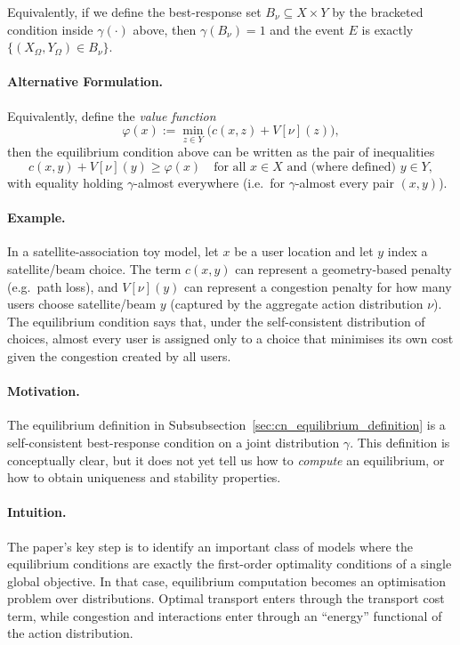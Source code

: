 Equivalently, if we define the best-response set $B_{\nu}\subseteq X\times Y$ by the bracketed condition inside
$\gamma(\cdot)$ above, then $\gamma(B_{\nu})=1$ and the event $E$ is exactly $\{(X_{\Omega},Y_{\Omega})\in B_{\nu}\}$.

\paragraph{Alternative Formulation.}

Equivalently, define the \emph{value function}
$$
\varphi(x):=\min_{z\in Y}\bigl(c(x,z)+V[\nu](z)\bigr),
$$
then the equilibrium condition above can be written as the pair of inequalities
$$
c(x,y)+V[\nu](y)\ge \varphi(x)\quad\text{for all }x\in X\text{ and (where defined) }y\in Y,
$$
with equality holding $\gamma$-almost everywhere (i.e.\ for $\gamma$-almost every pair $(x,y)$).

\paragraph{Example.}
In a satellite-association toy model, let $x$ be a user location and let $y$ index a satellite/beam choice. The term
$c(x,y)$ can represent a geometry-based penalty (e.g.\ path loss), and $V[\nu](y)$ can represent a congestion penalty for
how many users choose satellite/beam $y$ (captured by the aggregate action distribution $\nu$). The equilibrium
condition says that, under the self-consistent distribution of choices, almost every user is assigned only to a choice
that minimises its own cost given the congestion created by all users.


\paragraph{Motivation.}
The equilibrium definition in Subsubsection~\ref{sec:cn_equilibrium_definition} is a self-consistent best-response
condition on a joint distribution $\gamma$.
This definition is conceptually clear, but it does not yet tell us how to \emph{compute} an equilibrium, or how to obtain
uniqueness and stability properties.

\paragraph{Intuition.}
The paper's key step is to identify an important class of models where the equilibrium conditions are exactly the
first-order optimality conditions of a single global objective. In that case, equilibrium computation becomes an
optimisation problem over distributions. Optimal transport enters through the transport cost term, while congestion and
interactions enter through an ``energy'' functional of the action distribution.

